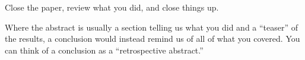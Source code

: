 Close the paper, review what you did, and close things up.

Where the abstract is usually a section telling us what you did and a ``teaser'' of the results, a conclusion would instead remind us of all of what you covered.
You can think of a conclusion as a ``retrospective abstract.''
